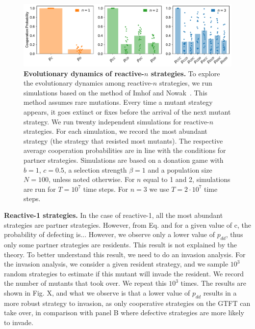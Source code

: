 \documentclass[11pt]{article}
\theoremstyle{plainCl1}
\theoremstyle{plainCl2}
\begin{document}
\begin{figure}[tbhp]
    \centering
    \includegraphics[width=\textwidth]{../../figures/siFig3AbundantStrategies.pdf}
    \caption{\textbf{Evolutionary dynamics of reactive-$n$ strategies.}
    To explore the evolutionary dynamics among reactive-$n$ strategies, we run simulations based on the
    method of Imhof and Nowak~\cite{imhof:royal:2010}. 
    This method assumes rare mutations. 
    Every time a mutant strategy appears, it goes extinct or fixes before the arrival of the next mutant strategy. 
    We run twenty independent simulations for reactive-$n$ strategies.
    For each simulation, we record the most abundant strategy (the strategy that resisted most mutants). 
    The respective average cooperation probabilities are in line with the conditions for partner strategies. 
    Simulations are based on a donation game with \(b\!=\!1\),  \(c\!=\!0.5\), a selection strength $\beta\!=\!1$
    and a population size $N\!=\!100$, unless noted otherwise. For $n$ equal to 1 and 2, simulations are run for \(T\!=\! 10 ^ 7\) time steps. For $n\!=\!3$ we use \(T\!=\! 2 \!\cdot\!10 ^ 7\) time steps.
    }\label{fig:evolutionary_results}
\end{figure}



\noindent
\textbf{Reactive-1 strategies.} In the case of reactive-1, all the most abundant
strategies are partner strategies. However, from Eq. and for a given value of c,
the probability of defecting is... However, we observe only a lower value of \(
p_{dd} \), thus only some partner strategies are residents. This result is not
explained by the theory. To better understand this result, we need to do an
invasion analysis. For the invasion analysis, we consider a given resident
strategy, and we sample \( 10^3 \) random strategies to estimate if this mutant
will invade the resident. We record the number of mutants that took over. We
repeat this \( 10^3 \) times. The results are shown in Fig. X, and what we
observe is that a lower value of \( p_{dd} \) results in a more robust strategy
to invasion, as only cooperative strategies on the GTFT can take over, in
comparison with panel B where defective strategies are more likely to invade.
\end{document}
